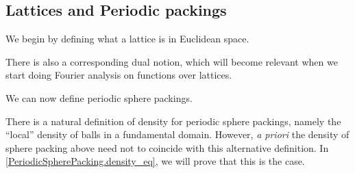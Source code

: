 \subsection{Lattices and Periodic packings}

We begin by defining what a lattice is in Euclidean space.


There is also a corresponding dual notion, which will become relevant when we start doing Fourier analysis on functions over lattices.




We can now define periodic sphere packings.



There is a natural definition of density for periodic sphere packings, namely the ``local'' density of balls in a fundamental domain. However, \textit{a priori} the density of sphere packing above need not to coincide with this alternative definition. In \cref{PeriodicSpherePacking.density_eq}, we will prove that this is the case.


